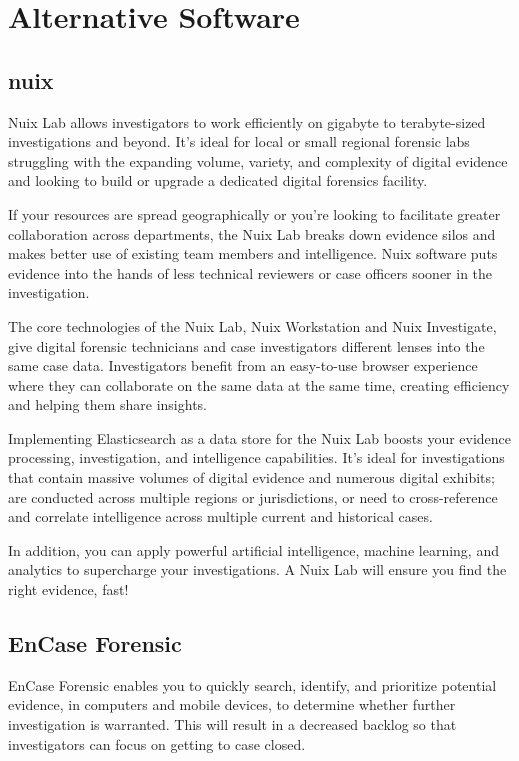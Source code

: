 \section{Alternative Software}


\subsection{nuix}

Nuix Lab allows investigators to work efficiently on gigabyte to terabyte-sized investigations and beyond.
It’s ideal for local or small regional forensic labs struggling with the expanding volume, variety, and 
complexity of digital evidence and looking to build or upgrade a dedicated digital forensics facility.

If your resources are spread geographically or you’re looking to facilitate greater collaboration across departments,
the Nuix Lab breaks down evidence silos and makes better use of existing team members and intelligence. Nuix software puts 
evidence into the hands of less technical reviewers or case officers sooner in the investigation.

The core technologies of the Nuix Lab, Nuix Workstation and Nuix Investigate, give digital forensic technicians and case investigators 
different lenses into the same case data. Investigators benefit from an easy-to-use browser experience where they can collaborate on 
the same data at the same time, creating efficiency and helping them share insights.

Implementing Elasticsearch as a data store for the Nuix Lab boosts your evidence processing, investigation, and intelligence capabilities. 
It’s ideal for investigations that contain massive volumes of digital evidence and numerous digital exhibits; are conducted across multiple
regions or jurisdictions, or need to cross-reference and correlate intelligence across multiple current and historical cases. 

In addition, you can apply powerful artificial intelligence, machine learning, and analytics to supercharge your investigations. 
A Nuix Lab will ensure you find the right evidence, fast!

\subsection{EnCase Forensic}

EnCase Forensic enables you to quickly search, identify, and prioritize potential evidence, in computers and mobile devices, to determine whether further investigation is warranted. This will result in a decreased backlog so that investigators can focus on getting to case closed. 

